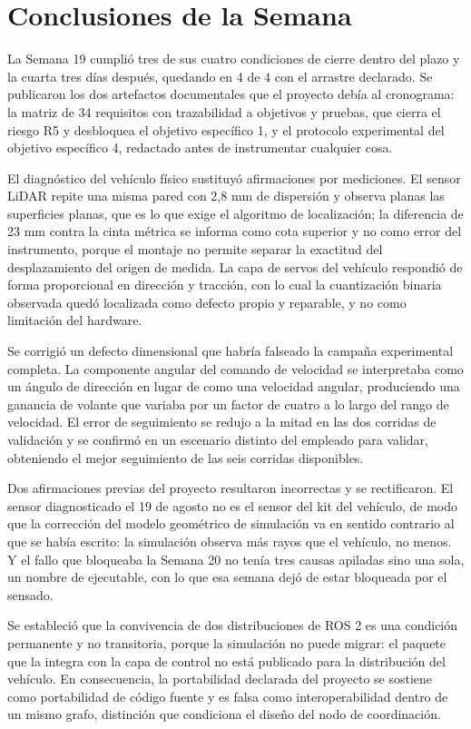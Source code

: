 \documentclass[12pt,letterpaper]{article}
\begin{document}
\section{Conclusiones de la Semana}

La Semana 19 cumplió tres de sus cuatro condiciones de cierre dentro del plazo y la cuarta tres días después, quedando en 4 de 4 con el arrastre declarado. Se publicaron los dos artefactos documentales que el proyecto debía al cronograma: la matriz de 34 requisitos con trazabilidad a objetivos y pruebas, que cierra el riesgo R5 y desbloquea el objetivo específico 1, y el protocolo experimental del objetivo específico 4, redactado antes de instrumentar cualquier cosa.

El diagnóstico del vehículo físico sustituyó afirmaciones por mediciones. El sensor LiDAR repite una misma pared con 2,8 mm de dispersión y observa planas las superficies planas, que es lo que exige el algoritmo de localización; la diferencia de 23 mm contra la cinta métrica se informa como cota superior y no como error del instrumento, porque el montaje no permite separar la exactitud del desplazamiento del origen de medida. La capa de servos del vehículo respondió de forma proporcional en dirección y tracción, con lo cual la cuantización binaria observada quedó localizada como defecto propio y reparable, y no como limitación del hardware.

Se corrigió un defecto dimensional que habría falseado la campaña experimental completa. La componente angular del comando de velocidad se interpretaba como un ángulo de dirección en lugar de como una velocidad angular, produciendo una ganancia de volante que variaba por un factor de cuatro a lo largo del rango de velocidad. El error de seguimiento se redujo a la mitad en las dos corridas de validación y se confirmó en un escenario distinto del empleado para validar, obteniendo el mejor seguimiento de las seis corridas disponibles.

Dos afirmaciones previas del proyecto resultaron incorrectas y se rectificaron. El sensor diagnosticado el 19 de agosto no es el sensor del kit del vehículo, de modo que la corrección del modelo geométrico de simulación va en sentido contrario al que se había escrito: la simulación observa más rayos que el vehículo, no menos. Y el fallo que bloqueaba la Semana 20 no tenía tres causas apiladas sino una sola, un nombre de ejecutable, con lo que esa semana dejó de estar bloqueada por el sensado.

Se estableció que la convivencia de dos distribuciones de ROS 2 es una condición permanente y no transitoria, porque la simulación no puede migrar: el paquete que la integra con la capa de control no está publicado para la distribución del vehículo. En consecuencia, la portabilidad declarada del proyecto se sostiene como portabilidad de código fuente y es falsa como interoperabilidad dentro de un mismo grafo, distinción que condiciona el diseño del nodo de coordinación.
\end{document}

